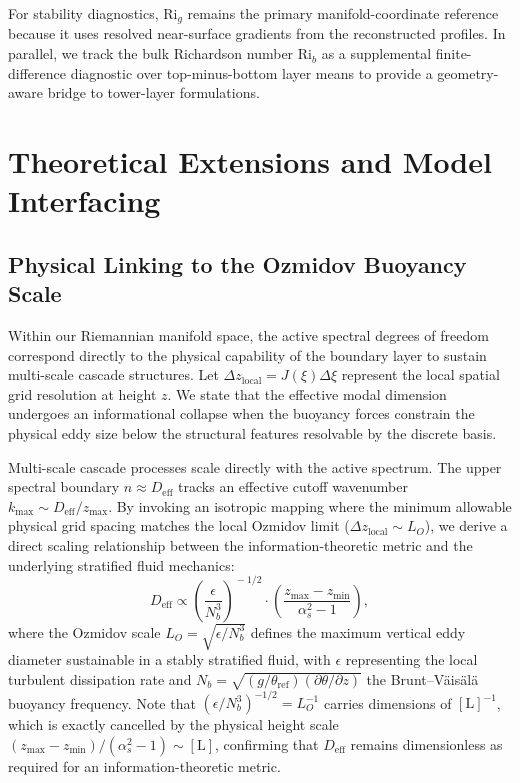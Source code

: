 \documentclass[11pt,a4paper]{article}
\begin{document}
For stability diagnostics, $\mathrm{Ri}_g$ remains the primary manifold-coordinate reference because it uses resolved near-surface gradients from the reconstructed profiles. In parallel, we track the bulk Richardson number $\mathrm{Ri}_b$ as a supplemental finite-difference diagnostic over top-minus-bottom layer means to provide a geometry-aware bridge to tower-layer formulations. \section{Theoretical Extensions and Model Interfacing}
\label{sec:extensions}

\subsection{Physical Linking to the Ozmidov Buoyancy Scale}
\label{sec:extensions:ozmidov}

Within our Riemannian manifold space, the active spectral degrees of freedom correspond directly to the physical capability of the boundary layer to sustain multi-scale cascade structures. Let $\Delta z_{\mathrm{local}} = J(\xi) \Delta \xi$ represent the local spatial grid resolution at height $z$. We state that the effective modal dimension undergoes an informational collapse when the buoyancy forces constrain the physical eddy size below the structural features resolvable by the discrete basis. 

Multi-scale cascade processes scale directly with the active spectrum. The upper spectral boundary $n \approx D_{\mathrm{eff}}$ tracks an effective cutoff wavenumber $k_{\max} \sim D_{\mathrm{eff}} / z_{\max}$. By invoking an isotropic mapping where the minimum allowable physical grid spacing matches the local Ozmidov limit ($\Delta z_{\mathrm{local}} \sim L_O$), we derive a direct scaling relationship between the information-theoretic metric and the underlying stratified fluid mechanics:
\begin{equation}
D_{\mathrm{eff}} \propto \left( \frac{\epsilon}{N_b^3} \right)^{\!-1/2} \cdot \left( \frac{z_{\max} - z_{\min}}{\alpha_s^2 - 1} \right),
\label{eq:d_eff_ozmidov_scaling}
\end{equation}
where the Ozmidov scale $L_O = \sqrt{\epsilon / N_b^3}$ defines the maximum vertical eddy diameter sustainable in a stably stratified fluid, with $\epsilon$ representing the local turbulent dissipation rate and $N_b = \sqrt{(g/\theta_{\mathrm{ref}}) (\partial \theta / \partial z)}$ the Brunt--Väisälä buoyancy frequency. Note that $(\epsilon / N_b^3)^{-1/2} = L_O^{-1}$ carries dimensions of $[\mathrm{L}]^{-1}$, which is exactly cancelled by the physical height scale $(z_{\max} - z_{\min})/(\alpha_s^2 - 1) \sim [\mathrm{L}]$, confirming that $D_{\mathrm{eff}}$ remains dimensionless as required for an information-theoretic metric.
\end{document}
